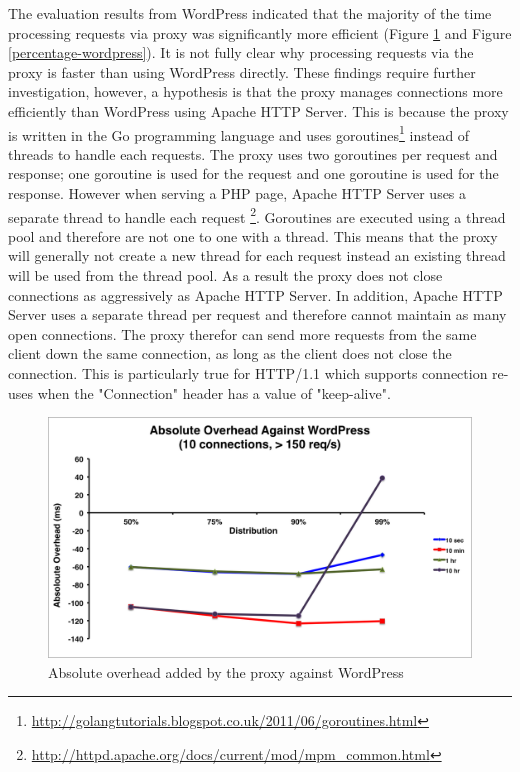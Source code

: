 \documentclass[a4paper,11pt,twoside]{report}
\begin{document}
The evaluation results from WordPress indicated that the majority of the time processing requests via proxy was significantly more efficient (Figure \ref{absoloute-wordpress} and Figure \ref{percentage-wordpress}). It is not fully clear why processing requests via the proxy is faster than using WordPress directly. These findings require further investigation, however, a hypothesis is that the proxy manages connections more efficiently than WordPress using Apache HTTP Server. This is because the proxy is written in the Go programming language and uses goroutines\footnote{\label{golangtutorials}\url{http://golangtutorials.blogspot.co.uk/2011/06/goroutines.html}}  instead of threads to handle each requests.  The proxy uses two goroutines per request and response; one goroutine is used for the request and one goroutine is used for the response. However when serving a PHP page, Apache HTTP Server uses a separate thread to handle each request \footnote{\label{apache_thread_per_req}\url{http://httpd.apache.org/docs/current/mod/mpm_common.html}}.  Goroutines are executed using a thread pool and therefore are not one to one with a thread. This means that the proxy will generally not create a new thread for each request instead an existing thread will be used from the thread pool. As a result the proxy does not close connections as aggressively as Apache HTTP Server.  In addition, Apache HTTP Server uses a separate thread per request and therefore cannot maintain as many open connections.  The proxy therefor can send more requests from the same client down the same connection, as long as the client does not close the connection. This is particularly true for HTTP/1.1 which supports connection re-uses when the "Connection" header has a value of "keep-alive".    

\begin{figure}[!ht]
  \centering
     \includegraphics[scale=0.55]{absoloute-wordpress}
  \caption{Absolute overhead added by the proxy against WordPress}
  \label{absoloute-wordpress}
\end{figure} 
\end{document}
